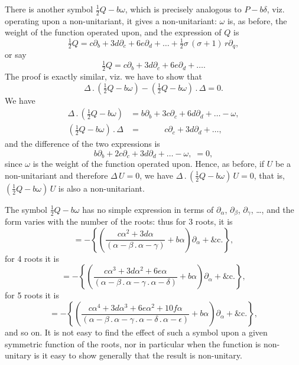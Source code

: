 \documentclass[11pt,a4paper]{book}
\begin{document}
\setcounter{art}{27}
\begin{art}
There is another symbol $\frac{1}{2}Q - b\omega$, which is precisely analogous to $P - b\delta$, viz. operating upon a non-unitariant, it gives a non-unitariant: $\omega$ is, as before, the weight of the function operated upon, and the expression of $Q$ is
\[
\tfrac{1}{2}Q = c\partial_{b} + 3d\partial_{c} + 6e\partial_{d} + \ldots + \tfrac{1}{2}\sigma\,(\sigma + 1)\,r\partial_{q},
\]
or say
\[
\tfrac{1}{2}Q = c\partial_{b} + 3d\partial_{c} + 6e\partial_{d} + \ldots.
\]
The proof is exactly similar, viz. we have to show that
\[
\Delta\,.\,(\tfrac{1}{2}Q - b\omega) - (\tfrac{1}{2}Q - b\omega)\,.\,\Delta = 0.
\]
We have
\begin{align*}
\Delta\,.\,(\tfrac{1}{2}Q - b\omega) &= b\partial_{b} + 3c\partial_{c} + 6d\partial_{d} + \ldots - \omega,\\
(\tfrac{1}{2}Q - b\omega)\,.\,\Delta &= \phantom{b\partial_{b} +}\; c\partial_{c} + 3d\partial_{d} + \ldots,
\end{align*}
and the difference of the two expressions is
\[
b\partial_{b} + 2c\partial_{c} + 3d\partial_{d} + \ldots - \omega,\; = 0,
\]
since $\omega$ is the weight of the function operated upon. Hence, as before, if $U$ be a non-unitariant and therefore $\Delta\,U = 0$, we have $\Delta\,.\,(\frac{1}{2}Q - b\omega)\,U = 0$, that is, $(\frac{1}{2}Q - b\omega)\,U$ is also a non-unitariant.
\end{art}

\setcounter{art}{28}
\begin{art}
The symbol $\frac{1}{2}Q - b\omega$ has no simple expression in terms of $\partial_{\alpha}$, $\partial_{\beta}$, $\partial_{\gamma}$, \ldots, and the form varies with the number of the roots: thus for 3 roots, it is
\[
= -\left\{\left(\frac{c\alpha^{2} + 3d\alpha}{(\alpha - \beta\,.\,\alpha - \gamma)} + b\alpha\right)\partial_{\alpha} + \&\mathrm{c}.\right\},
\]
for 4 roots it is
\[
= -\left\{\left(\frac{c\alpha^{3} + 3d\alpha^{2} + 6e\alpha}{(\alpha - \beta\,.\,\alpha - \gamma\,.\,\alpha - \delta)} + b\alpha\right)\partial_{\alpha} + \&\mathrm{c}.\right\},
\]
for 5 roots it is
\[
= -\left\{\left(\frac{c\alpha^{4} + 3d\alpha^{3} + 6e\alpha^{2} + 10f\alpha}{(\alpha - \beta\,.\,\alpha - \gamma\,.\,\alpha - \delta\,.\,\alpha - \epsilon)} + b\alpha\right)\partial_{\alpha} + \&\mathrm{c}.\right\},
\]
and so on. It is not easy to find the effect of such a symbol upon a given symmetric function of the roots, nor in particular when the function is non-unitary is it easy to show generally that the result is non-unitary.
\end{art}
\end{document}
